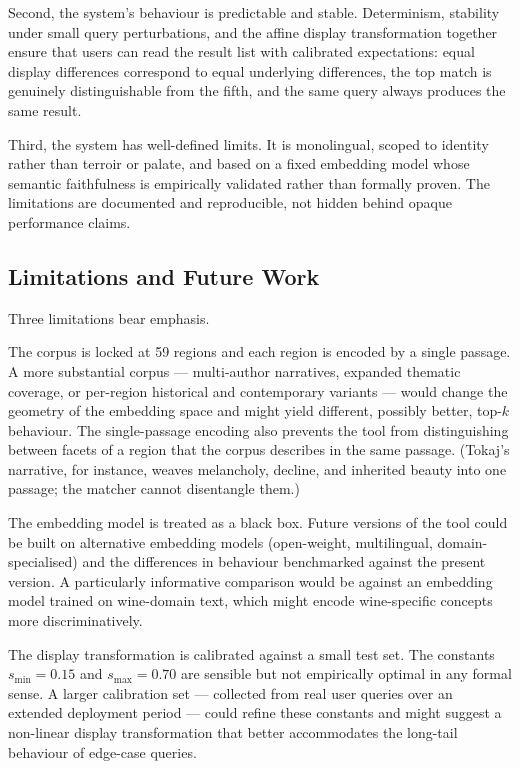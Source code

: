 \documentclass[11pt]{article}
\begin{document}
Second, the system's behaviour is predictable and stable. Determinism, stability under small query perturbations, and the affine display transformation together ensure that users can read the result list with calibrated expectations: equal display differences correspond to equal underlying differences, the top match is genuinely distinguishable from the fifth, and the same query always produces the same result.

Third, the system has well-defined limits. It is monolingual, scoped to identity rather than terroir or palate, and based on a fixed embedding model whose semantic faithfulness is empirically validated rather than formally proven. The limitations are documented and reproducible, not hidden behind opaque performance claims.

\subsection{Limitations and Future Work}
Three limitations bear emphasis.

The corpus is locked at 59 regions and each region is encoded by a single passage. A more substantial corpus --- multi-author narratives, expanded thematic coverage, or per-region historical and contemporary variants --- would change the geometry of the embedding space and might yield different, possibly better, top-$k$ behaviour. The single-passage encoding also prevents the tool from distinguishing between facets of a region that the corpus describes in the same passage. (Tokaj's narrative, for instance, weaves melancholy, decline, and inherited beauty into one passage; the matcher cannot disentangle them.)

The embedding model is treated as a black box. Future versions of the tool could be built on alternative embedding models (open-weight, multilingual, domain-specialised) and the differences in behaviour benchmarked against the present version. A particularly informative comparison would be against an embedding model trained on wine-domain text, which might encode wine-specific concepts more discriminatively.

The display transformation is calibrated against a small test set. The constants $s_{\min} = 0.15$ and $s_{\max} = 0.70$ are sensible but not empirically optimal in any formal sense. A larger calibration set --- collected from real user queries over an extended deployment period --- could refine these constants and might suggest a non-linear display transformation that better accommodates the long-tail behaviour of edge-case queries.
\end{document}
